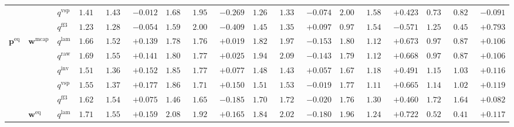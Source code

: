 \documentclass{article}
\begin{document}
\begin{table}[!htbp]
{\begin{tabular}{lll ccc ccc ccc ccc ccc}
 &  & $q^{\mathrm{vsp}}$ & $1.418$ & $1.430$ & \cellcolor{negred!50}$-0.012$ & $1.688$ & $1.957$ & \cellcolor{negred!50}$-0.269$ & $1.265$ & $1.338$ & \cellcolor{negred!50}$-0.074$ & $2.007$ & $1.584$ & \cellcolor{posgreen!50}$+0.423$ & $0.737$ & $0.828$ & \cellcolor{negred!50}$-0.091$ \\
 &  & $q^{\mathrm{ff3}}$ & $1.233$ & $1.288$ & \cellcolor{negred!50}$-0.054$ & $1.595$ & $2.004$ & \cellcolor{negred!50}$-0.409$ & $1.455$ & $1.358$ & \cellcolor{posgreen!50}$+0.097$ & $0.970$ & $1.541$ & \cellcolor{negred!50}$-0.571$ & $1.251$ & $0.458$ & \cellcolor{posgreen!50}$+0.793$ \\
\midrule
$\mathbf{p}^{\mathrm{eq}}$ & $\mathbf{w}^{\mathrm{mcap}}$ & $q^{\mathrm{lam}}$ & $1.662$ & $1.523$ & \cellcolor{posgreen!50}$+0.139$ & $1.784$ & $1.765$ & \cellcolor{posgreen!50}$+0.019$ & $1.821$ & $1.974$ & \cellcolor{negred!50}$-0.153$ & $1.800$ & $1.127$ & \cellcolor{posgreen!50}$+0.673$ & $0.978$ & $0.872$ & \cellcolor{posgreen!50}$+0.106$ \\
 &  & $q^{\mathrm{raw}}$ & $1.696$ & $1.555$ & \cellcolor{posgreen!50}$+0.141$ & $1.800$ & $1.775$ & \cellcolor{posgreen!50}$+0.025$ & $1.947$ & $2.090$ & \cellcolor{negred!50}$-0.143$ & $1.795$ & $1.127$ & \cellcolor{posgreen!50}$+0.668$ & $0.978$ & $0.872$ & \cellcolor{posgreen!50}$+0.106$ \\
 &  & $q^{\mathrm{inv}}$ & $1.519$ & $1.367$ & \cellcolor{posgreen!50}$+0.152$ & $1.851$ & $1.774$ & \cellcolor{posgreen!50}$+0.077$ & $1.489$ & $1.431$ & \cellcolor{posgreen!50}$+0.057$ & $1.674$ & $1.183$ & \cellcolor{posgreen!50}$+0.491$ & $1.150$ & $1.034$ & \cellcolor{posgreen!50}$+0.116$ \\
 &  & $q^{\mathrm{vsp}}$ & $1.555$ & $1.378$ & \cellcolor{posgreen!50}$+0.177$ & $1.866$ & $1.716$ & \cellcolor{posgreen!50}$+0.150$ & $1.516$ & $1.534$ & \cellcolor{negred!50}$-0.019$ & $1.775$ & $1.110$ & \cellcolor{posgreen!50}$+0.665$ & $1.141$ & $1.022$ & \cellcolor{posgreen!50}$+0.119$ \\
 &  & $q^{\mathrm{ff3}}$ & $1.623$ & $1.548$ & \cellcolor{posgreen!50}$+0.075$ & $1.468$ & $1.653$ & \cellcolor{negred!50}$-0.185$ & $1.701$ & $1.721$ & \cellcolor{negred!50}$-0.020$ & $1.767$ & $1.307$ & \cellcolor{posgreen!50}$+0.460$ & $1.724$ & $1.642$ & \cellcolor{posgreen!50}$+0.082$ \\
\cmidrule(lr){2-18}
 & $\mathbf{w}^{\mathrm{eq}}$ & $q^{\mathrm{lam}}$ & $1.715$ & $1.556$ & \cellcolor{posgreen!50}$+0.159$ & $2.088$ & $1.923$ & \cellcolor{posgreen!50}$+0.165$ & $1.844$ & $2.025$ & \cellcolor{negred!50}$-0.180$ & $1.961$ & $1.240$ & \cellcolor{posgreen!50}$+0.722$ & $0.529$ & $0.411$ & \cellcolor{posgreen!50}$+0.117$ \\

\end{tabular}}
\end{table}
\end{document}
